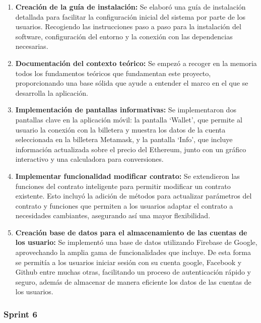 \begin{enumerate}

\item \textbf{Creación de la guía de instalación:} Se elaboró una guía de instalación detallada para facilitar la configuración inicial del sistema por parte de los usuarios. Recogiendo las instrucciones paso a paso para la instalación del software, configuración del entorno y la conexión con las dependencias necesarias.

\item \textbf{Documentación del contexto teórico:}  Se empezó a recoger en la memoria todos los fundamentos teóricos que fundamentan este proyecto, proporcionando una base sólida que ayude a entender el marco en el que se desarrolla la aplicación. 

\item \textbf{Implementación de pantallas informativas:} Se implementaron dos pantallas clave en la aplicación móvil: la pantalla `Wallet', que permite al usuario la conexión con la billetera y muestra los datos de la cuenta seleccionada en la billetera Metamask, y la pantalla `Info', que incluye información actualizada sobre el precio del Ethereum, junto con un gráfico interactivo y una calculadora para conversiones.

\item \textbf{Implementar funcionalidad modificar contrato:} Se extendieron las funciones del contrato inteligente para permitir modificar un contrato existente. Esto incluyó la adición de métodos para actualizar parámetros del contrato y funciones que permiten a los usuarios adaptar el contrato a necesidades cambiantes, asegurando así una mayor flexibilidad.

\item \textbf{Creación base de datos para el almacenamiento de las cuentas de los usuario:}  Se implementó una base de datos utilizando Firebase de Google, aprovechando la amplia gama de funcionalidades que incluye. De esta forma se permitía a los usuarios iniciar sesión con su cuenta google, Facebook y Github entre muchas otras, facilitando un proceso de autenticación rápido y seguro, además de almacenar de manera eficiente los datos de las cuentas de los usuarios.

\end{enumerate}


\subsubsection{Sprint 6}


